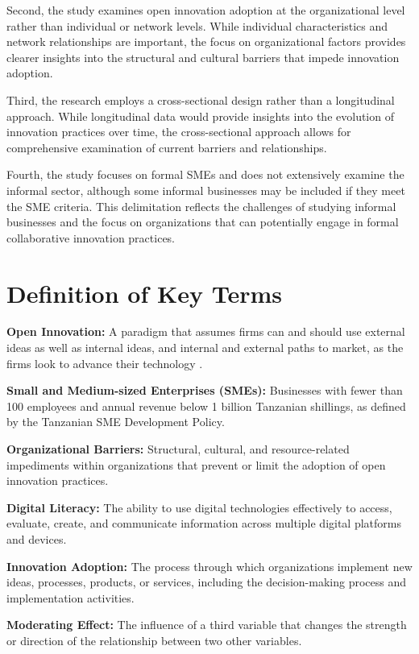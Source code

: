 \documentclass[12pt,a4paper]{article}
\begin{document}
Second, the study examines open innovation adoption at the organizational level rather than individual or network levels. While individual characteristics and network relationships are important, the focus on organizational factors provides clearer insights into the structural and cultural barriers that impede innovation adoption.

Third, the research employs a cross-sectional design rather than a longitudinal approach. While longitudinal data would provide insights into the evolution of innovation practices over time, the cross-sectional approach allows for comprehensive examination of current barriers and relationships.

Fourth, the study focuses on formal SMEs and does not extensively examine the informal sector, although some informal businesses may be included if they meet the SME criteria. This delimitation reflects the challenges of studying informal businesses and the focus on organizations that can potentially engage in formal collaborative innovation practices.

\section{Definition of Key Terms}

\textbf{Open Innovation:} A paradigm that assumes firms can and should use external ideas as well as internal ideas, and internal and external paths to market, as the firms look to advance their technology \cite{chesbrough2003open}.

\textbf{Small and Medium-sized Enterprises (SMEs):} Businesses with fewer than 100 employees and annual revenue below 1 billion Tanzanian shillings, as defined by the Tanzanian SME Development Policy.

\textbf{Organizational Barriers:} Structural, cultural, and resource-related impediments within organizations that prevent or limit the adoption of open innovation practices.

\textbf{Digital Literacy:} The ability to use digital technologies effectively to access, evaluate, create, and communicate information across multiple digital platforms and devices.

\textbf{Innovation Adoption:} The process through which organizations implement new ideas, processes, products, or services, including the decision-making process and implementation activities.

\textbf{Moderating Effect:} The influence of a third variable that changes the strength or direction of the relationship between two other variables.
\end{document}
